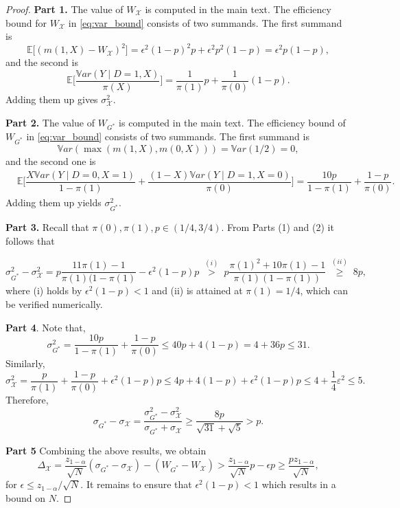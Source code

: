 \documentclass[12pt]{article}
\numberwithin{equation}{section}
\theoremstyle{plain}                         %
\theoremstyle{definition}                  %
\theoremstyle{remark}                      %
\newcommand{\E}{\mathbb{E}}
\newcommand{\Var}{\mathbb{V}ar}
\begin{document}
\begin{proof}[Proof]



\textbf{Part 1.}  The value of $W_{\mathcal{X}}$ is computed in the main text. The efficiency bound for $W_{\mathcal{X}}$ in \eqref{eq:var_bound} consists of two summands.
The first summand is
$$
\E \bigg[(m(1,X) - W_{\mathcal{X}})^2 \bigg]= \epsilon^2 (1-p)^2 p + \epsilon^2 p^2 (1-p) = \epsilon^2 p (1-p),
$$
and the second is
$$
\E \bigg[ \dfrac{  \Var (Y \mid D=1, X) }{\pi(X)}  \bigg] = \dfrac{1}{\pi(1)} p + \dfrac{1}{\pi(0)} (1-p).
$$
 Adding them up gives $\sigma^2_{\mathcal{X}}$. 

\noindent 
\textbf{Part 2.} The value of $W_{G^*}$ is computed in the main text. The efficiency bound of $W_{G^{*}}$ in \eqref{eq:var_bound} consists of two summands. The first summand is
 \[
 \Var (\max (m(1,X), m(0,X))) =\Var(1/2) =0,
 \]
 and the second one is 
\begin{align*}
&\E \bigg[\dfrac{ X \Var (Y \mid D=0, X=1) }{1-\pi(1)} + \dfrac{ (1-X) \Var (Y \mid D=1, X=0) }{\pi(0)} \bigg] = \dfrac{10 p}{ 1-\pi (1)}
 + \dfrac{1-p}{ \pi (0)}.
\end{align*}
Adding them up yields $\sigma^2_{G^{*}}$. 

\noindent 
\textbf{Part 3.} Recall that $\pi(0), \pi(1), p \in (1/4, 3/4)$. From Parts (1) and (2) it follows that

\[
\sigma^2_{G^*} - \sigma^2_{\mathcal{X}} = p \frac{11\pi(1) - 1}{\pi(1)(1-\pi(1)} - \epsilon^2(1-p)p \; \overset{(i)}{>} \; p \frac{\pi(1)^2 + 10\pi(1) - 1}{\pi(1)(1-\pi(1))} \; \overset{(ii)}{\geq} \; 8p,
\]
where (i) holds by $\epsilon^2(1-p) < 1$ and (ii) is attained at $\pi(1) = 1/4$, which can be verified numerically. 

\noindent 
\textbf{Part 4}. Note that, 
\[
\sigma^2_{G^*} = \frac{10p}{1-\pi(1)} + \frac{1-p}{\pi(0)} \leq 40p + 4(1-p) = 4 + 36p \leq 31.
\] 
Similarly,
\[
\sigma^2_{\mathcal{X}} = \frac{p}{\pi(1)} + \frac{1-p}{\pi(0)} + \epsilon^2(1-p)p \leq 4p + 4(1-p) + \epsilon^2(1-p)p \leq 4 + \frac{1}{4} \varepsilon^2 \leq 5.
\]
Therefore,
\[
\sigma_{G^{*}}-\sigma_{\mathcal{X}} = \dfrac{\sigma^2_{G^{*}}-\sigma^2_{\mathcal{X}}}{\sigma_{G^{*}}+\sigma_{\mathcal{X}}}  \geq \dfrac{8p}{\sqrt{31} + \sqrt{5}} > p.
\]

\noindent 
\textbf{Part 5} Combining the above results, we obtain
\[
\Delta_{\mathcal{X}} = \frac{z_{1-\alpha}}{\sqrt{N}}(\sigma_{G^*} - \sigma_{\mathcal{X}}) - (W_{G^*} - W_{\mathcal{X}}) > \frac{z_{1-\alpha}}{\sqrt{N}}p - \epsilon p \geqslant   \frac{pz_{1-\alpha}}{\sqrt{N}},
\]
for $\epsilon \leq z_{1-\alpha} / \sqrt{N}$. It remains to ensure that $\epsilon^2(1-p) < 1$ which results in a bound on $N$.
 \end{proof}
\end{document}
